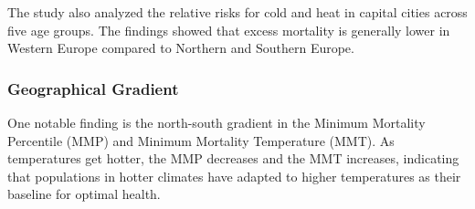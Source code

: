 \documentclass[
]{krantz}
\begin{document}
The study also analyzed the relative risks for cold and heat in capital cities across five age groups. The findings showed that excess mortality is generally lower in Western Europe compared to Northern and Southern Europe.

\subsubsection{Geographical Gradient}\label{geographical-gradient}

One notable finding is the north-south gradient in the Minimum Mortality Percentile (MMP) and Minimum Mortality Temperature (MMT). As temperatures get hotter, the MMP decreases and the MMT increases, indicating that populations in hotter climates have adapted to higher temperatures as their baseline for optimal health.
\end{document}
